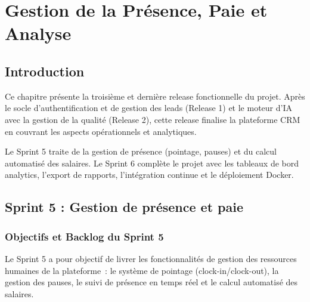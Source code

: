 \chapter[Présence, Paie et Analytics]{Gestion de la Présence, Paie et Analyse}
\label{chap:presence_salary_analytics}

\section*{Introduction}
\label{sec:chap6_introduction}

Ce chapitre présente la troisième et dernière release fonctionnelle du projet. Après le socle
d'authentification et de gestion des leads (Release 1) et le moteur d'IA avec la gestion de la
qualité (Release 2), cette release finalise la plateforme CRM en couvrant les aspects
opérationnels et analytiques.

Le Sprint 5 traite de la gestion de présence (pointage, pauses) et du calcul automatisé des
salaires. Le Sprint 6 complète le projet avec les tableaux de bord analytics, l'export de
rapports, l'intégration continue et le déploiement Docker.

\section[Sprint 5 : Présence et Paie]{Sprint 5 : Gestion de présence et paie}
\label{sec:sprint5}

\subsection{Objectifs et Backlog du Sprint 5}
\label{subsec:sprint5_backlog}

Le Sprint 5 a pour objectif de livrer les fonctionnalités de gestion des ressources humaines
de la plateforme~: le système de pointage (clock-in/clock-out), la gestion des pauses, le
suivi de présence en temps réel et le calcul automatisé des salaires.

